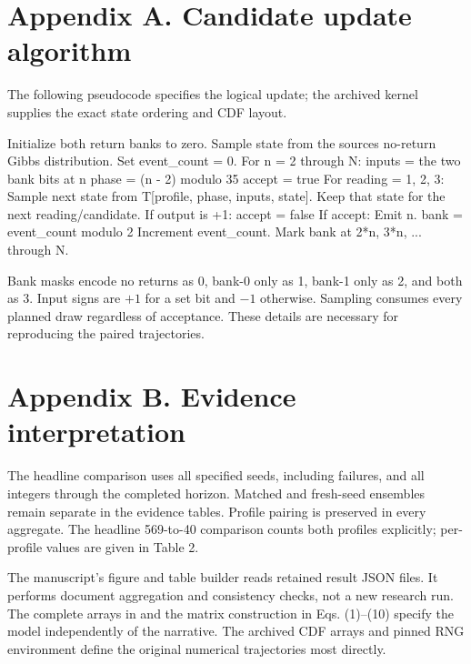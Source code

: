 \documentclass[
  11pt,
]{article}
\newenvironment{Shaded}{}{}
\newcommand{\NormalTok}[1]{#1}
\begin{document}
\section{Appendix A. Candidate update
algorithm}\label{appendix-a.-candidate-update-algorithm}

The following pseudocode specifies the logical update; the archived
kernel supplies the exact state ordering and CDF layout.

\begin{Shaded}
\begin{Highlighting}[]
\NormalTok{Initialize both return banks to zero.}
\NormalTok{Sample state from the source\textquotesingle{}s no{-}return Gibbs distribution.}
\NormalTok{Set event\_count = 0.}
\NormalTok{For n = 2 through N:}
\NormalTok{    inputs = the two bank bits at n}
\NormalTok{    phase = (n {-} 2) modulo 35}
\NormalTok{    accept = true}
\NormalTok{    For reading = 1, 2, 3:}
\NormalTok{        Sample next state from T[profile, phase, inputs, state].}
\NormalTok{        Keep that state for the next reading/candidate.}
\NormalTok{        If output is +1: accept = false}
\NormalTok{    If accept:}
\NormalTok{        Emit n.}
\NormalTok{        bank = event\_count modulo 2}
\NormalTok{        Increment event\_count.}
\NormalTok{        Mark bank at 2*n, 3*n, ... through N.}
\end{Highlighting}
\end{Shaded}

Bank masks encode no returns as 0, bank-0 only as 1, bank-1 only as 2,
and both as 3. Input signs are \(+1\) for a set bit and \(-1\)
otherwise. Sampling consumes every planned draw regardless of
acceptance. These details are necessary for reproducing the paired
trajectories.

\section{Appendix B. Evidence
interpretation}\label{appendix-b.-evidence-interpretation}

The headline comparison uses all specified seeds, including failures,
and all integers through the completed horizon. Matched and fresh-seed
ensembles remain separate in the evidence tables. Profile pairing is
preserved in every aggregate. The headline 569-to-40 comparison counts
both profiles explicitly; per-profile values are given in Table 2.

The manuscript's figure and table builder reads retained result JSON
files. It performs document aggregation and consistency checks, not a
new research run. The complete arrays in
\texttt{} and the matrix construction in
Eqs. (1)--(10) specify the model independently of the narrative. The
archived CDF arrays and pinned RNG environment define the original
numerical trajectories most directly.
\end{document}
